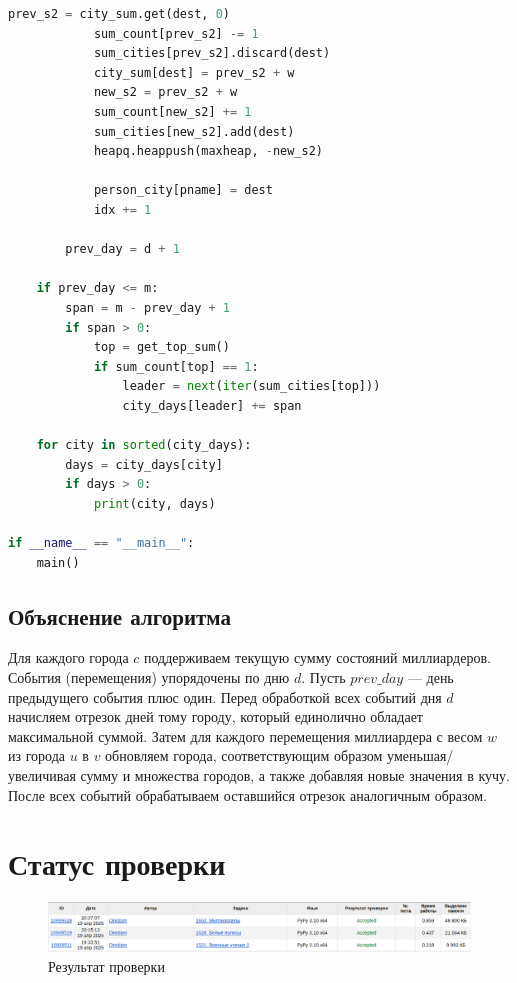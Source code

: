 \documentclass[a4paper,12pt]{article}
\begin{document}
\begin{lstlisting}[language=python]
            prev_s2 = city_sum.get(dest, 0)
            sum_count[prev_s2] -= 1
            sum_cities[prev_s2].discard(dest)
            city_sum[dest] = prev_s2 + w
            new_s2 = prev_s2 + w
            sum_count[new_s2] += 1
            sum_cities[new_s2].add(dest)
            heapq.heappush(maxheap, -new_s2)

            person_city[pname] = dest
            idx += 1

        prev_day = d + 1

    if prev_day <= m:
        span = m - prev_day + 1
        if span > 0:
            top = get_top_sum()
            if sum_count[top] == 1:
                leader = next(iter(sum_cities[top]))
                city_days[leader] += span

    for city in sorted(city_days):
        days = city_days[city]
        if days > 0:
            print(city, days)

if __name__ == "__main__":
    main()
\end{lstlisting}
\subsection*{Объяснение алгоритма}
Для каждого города \(c\) поддерживаем текущую сумму состояний миллиардеров. События (перемещения) упорядочены по дню \(d\). Пусть \(\mathit{prev\_day}\) --- день предыдущего события плюс один. Перед обработкой всех событий дня \(d\) начисляем отрезок дней тому городу, который единолично обладает максимальной суммой. Затем для каждого перемещения миллиардера с весом \(w\) из города \(u\) в \(v\) обновляем города, соответствующим образом уменьшая/увеличивая сумму и множества городов, а также добавляя новые значения в кучу. После всех событий обрабатываем оставшийся отрезок аналогичным образом.

\section*{Статус проверки}
\begin{figure}[H]
    \centering
    \includegraphics[width=1\textwidth]{check_status.png}
    \caption{Результат проверки}
\end{figure}
\end{document}
